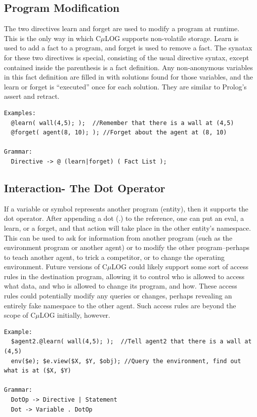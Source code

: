 \documentclass[onecolumn,titlepage]{article}
\begin{document}
\subsection{Program Modification}
The two directives learn and forget are used to modify a program at
runtime.  This is the only way in which C$\mu$LOG supports
non-volatile storage.  Learn is used to add a fact to a program, and
forget is used to remove a fact.  The synatax for these two directives
is special, consisting of the usual directive syntax, except contained
inside the parenthesis is a fact definition.  Any non-anonymous
variables in this fact definition are filled in with solutions found
for those variables, and the learn or forget is ``executed'' once for
each solution.  They are similar to Prolog's assert and retract.
\begin{verbatim}
Examples:
  @learn( wall(4,5); );  //Remember that there is a wall at (4,5)
  @forget( agent(8, 10); ); //Forget about the agent at (8, 10)

Grammar:
  Directive -> @ (learn|forget) ( Fact List ); 
\end{verbatim}


\subsection{Interaction- The Dot Operator}
If a variable or symbol represents another program (entity), then it supports
the dot operator.  After appending a dot (.) to the reference, one can put
an eval, a learn, or a forget, and that action will take place in the other
entity's namespace.  This can be used to ask for information from another program
(such as the environment program or another agent) or to modify the other
program--perhaps to teach another agent, to trick a competitor, or to change
the operating environment.  Future versions of C$\mu$LOG could likely support
some sort of access rules in the destination program, allowing it to control who is
allowed to access what data, and who is allowed to change its program, and how.
These access rules could potentially modify any queries or changes, perhaps
revealing an entirely fake namespace to the other agent.  Such access rules are
beyond the scope of C$\mu$LOG initially, however.
\begin{verbatim}
Example:
  $agent2.@learn( wall(4,5); );  //Tell agent2 that there is a wall at (4,5)
  env($e); $e.view($X, $Y, $obj); //Query the environment, find out what is at ($X, $Y)

Grammar:
  DotOp -> Directive | Statement
  Dot -> Variable . DotOp
\end{verbatim}
\end{document}
